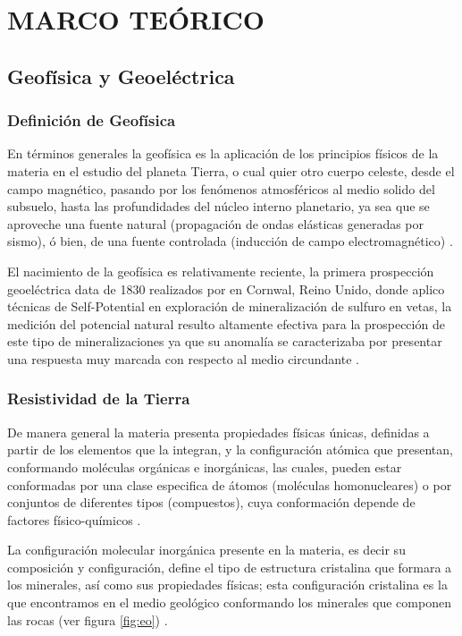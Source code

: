 \chapter{MARCO TEÓRICO}
	\section{Geofísica y Geoeléctrica}
		\subsection{Definición de Geofísica}
			
			En términos generales la geofísica es la aplicación de los principios físicos de la materia en el estudio del planeta Tierra, o cual quier otro cuerpo celeste, desde el campo magnético, pasando por los fenómenos atmosféricos al medio solido del subsuelo, hasta las profundidades del núcleo interno planetario, ya sea que se aproveche una fuente natural (propagación de ondas elásticas generadas por sismo), ó bien, de una fuente controlada (inducción de campo electromagnético) \citep{parasnis2012, reynolds2011, lay1995}.   
		
			El  nacimiento de la geofísica es relativamente reciente, la primera prospección geoeléctrica data de 1830 realizados por \cite{fox1830} en Cornwal, Reino Unido, donde aplico técnicas de Self-Potential en exploración de mineralización de sulfuro en vetas, la medición del potencial natural resulto altamente efectiva para la prospección de este tipo de mineralizaciones ya que su anomalía se caracterizaba por presentar una respuesta muy marcada con respecto al medio circundante \citep{reynolds2011, revil2013}.
			
		\subsection{Resistividad de la Tierra}
				
			De manera general la materia presenta propiedades físicas únicas, definidas a partir de los elementos que la integran, y la configuración atómica que presentan, conformando moléculas orgánicas e inorgánicas, las cuales, pueden estar conformadas por una clase especifica de átomos (moléculas homonucleares) o por conjuntos de diferentes tipos (compuestos), cuya conformación depende de factores físico-químicos \citep{tiab2024}.
			
			La configuración molecular inorgánica presente en la materia, es decir su composición y configuración, define el tipo de estructura cristalina que formara a los minerales, así como sus propiedades físicas; esta configuración cristalina es la que encontramos en el medio geológico conformando los minerales que componen las rocas (ver figura \ref{fig:eo}) \citep{gandhi2016, tiab2024}.\\
			
